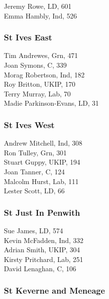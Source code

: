 \documentclass[a4paper,openany,10pt]{book}
\begin{document}
Jeremy Rowe, LD, 601\\
Emma Hambly, Ind, 526\\


\subsubsection*{St Ives East}



Tim Andrewes, Grn, 471\\
Joan Symons, C, 339\\
Morag Robertson, Ind, 182\\
Roy Britton, UKIP, 170\\
Terry Murray, Lab, 70\\
{Madie Parkinson-Evans}, LD, 31\\


\subsubsection*{St Ives West}



Andrew Mitchell, Ind, 308\\
Ron Tulley, Grn, 301\\
Stuart Guppy, UKIP, 194\\
Joan Tanner, C, 124\\
Malcolm Hurst, Lab, 111\\
Lester Scott, LD, 66\\


\subsubsection*{St Just In Penwith}



Sue James, LD, 574\\
Kevin McFadden, Ind, 332\\
Adrian Smith, UKIP, 304\\
Kirsty Pritchard, Lab, 251\\
David Lenaghan, C, 106\\


\subsubsection*{St Keverne and Meneage}
\end{document}
